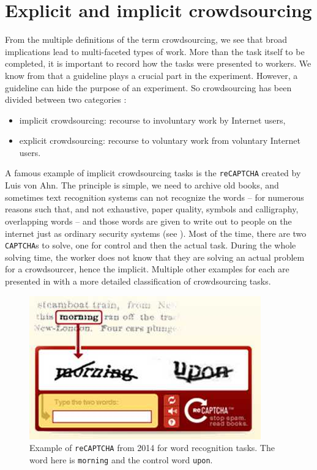 \section{Explicit and implicit crowdsourcing}
\label{sub:explicit-and-implicit}

From the multiple definitions of the term crowdsourcing, we see that broad implications lead to multi-faceted types of work.
More than the task itself to be completed, it is important to record how the tasks were presented to workers.
We know from  that a guideline plays a crucial part in the experiment.
However, a guideline can hide the purpose of an experiment. So crowdsourcing has been divided between two categories \citep{andro2017digital}:
\begin{itemize}
    \item implicit crowdsourcing: recourse to involuntary work by Internet users,
    \item explicit crowdsourcing: recourse to voluntary work from voluntary Internet users.
\end{itemize}

A famous example of implicit crowdsourcing tasks is the \texttt{reCAPTCHA} created by Luis von Ahn.
The principle is simple, we need to archive old books, and sometimes text recognition systems can not recognize the words -- for numerous reasons such that, and not exhaustive, paper quality, symbols and calligraphy, overlapping words -- and those words are given to write out to people on the internet just as ordinary security systems (see ).
Most of the time, there are two \texttt{CAPTCHA}s to solve, one for control and then the actual task.
During the whole solving time, the worker does not know that they are solving an actual problem for a crowdsourcer, hence the implicit.
Multiple other examples for each are presented in  with a more detailed classification of crowdsourcing tasks.

\begin{figure}[ht]
    \centering
    \includegraphics[width=.5\textwidth]{chapters/images/recaptcha.jpg}
    \caption{Example of \texttt{reCAPTCHA} from 2014 for word recognition tasks. The word here is \texttt{morning} and the control word \texttt{upon}.}
    \label{fig:recaptcha}
\end{figure}


